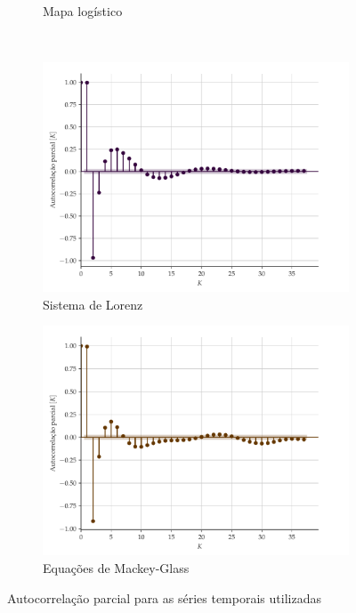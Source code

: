 \documentclass[a4paper, 12pt]{article}
\begin{document}
\begin{figure}[H]
\begin{subfigure}[t]{0.35\textwidth}
         \caption{Mapa logístico}
     \end{subfigure}
     \centering
     \\
     \begin{subfigure}[t]{0.35\textwidth}
         \includegraphics[scale=0.35]{autocorrelacao-parcial-lorenz.pdf}
         \caption{Sistema de Lorenz}
     \end{subfigure}
     \centering
     \begin{subfigure}[t]{0.35\textwidth} 
         \includegraphics[scale=0.35]{autocorrelacao-parcial-mackeyglass.pdf}
         \caption{Equações de Mackey-Glass}
     \end{subfigure}  
     \centering   
     \caption{Autocorrelação parcial para as séries temporais utilizadas}
     \label{fig:autocorrelation}
\end{figure}
\end{document}
